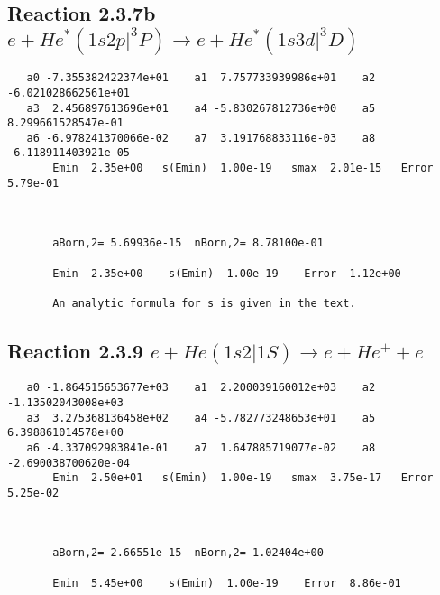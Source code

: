 \documentclass[12pt]{article}
\begin{document}
\newpage
\subsection{
Reaction 2.3.7b $e + He^*(1s2p|^3P) \rightarrow e + He^*(1s3d|^3D)$}

















\begin{small}\begin{verbatim}
   a0 -7.355382422374e+01    a1  7.757733939986e+01    a2 -6.021028662561e+01
   a3  2.456897613696e+01    a4 -5.830267812736e+00    a5  8.299661528547e-01
   a6 -6.978241370066e-02    a7  3.191768833116e-03    a8 -6.118911403921e-05
       Emin  2.35e+00   s(Emin)  1.00e-19   smax  2.01e-15   Error  5.79e-01



       aBorn,2= 5.69936e-15  nBorn,2= 8.78100e-01

       Emin  2.35e+00    s(Emin)  1.00e-19    Error  1.12e+00

       An analytic formula for s is given in the text.
\end{verbatim}\end{small}




\newpage
\subsection{
Reaction 2.3.9 $   e + He(1s2|1S) \rightarrow e + He^+ + e$}


                              

\begin{small}\begin{verbatim}
   a0 -1.864515653677e+03    a1  2.200039160012e+03    a2 -1.13502043008e+03
   a3  3.275368136458e+02    a4 -5.782773248653e+01    a5  6.398861014578e+00
   a6 -4.337092983841e-01    a7  1.647885719077e-02    a8 -2.690038700620e-04
       Emin  2.50e+01   s(Emin)  1.00e-19   smax  3.75e-17   Error  5.25e-02



       aBorn,2= 2.66551e-15  nBorn,2= 1.02404e+00

       Emin  5.45e+00    s(Emin)  1.00e-19    Error  8.86e-01
\end{verbatim}\end{small}
\end{document}
